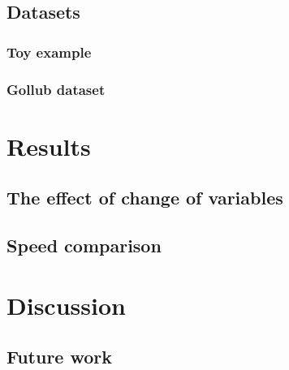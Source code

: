 \documentclass[10pt,letterpaper]{article}
\begin{document}

\subsubsection{}

\subsection{Datasets}

\subsubsection{Toy example}

\subsubsection{Gollub dataset}

\section*{Results}

\subsection{The effect of change of variables}

\subsection{Speed comparison}

\subsection{}

\section*{Discussion}

%

\subsection{Future work}
%
\end{document}
